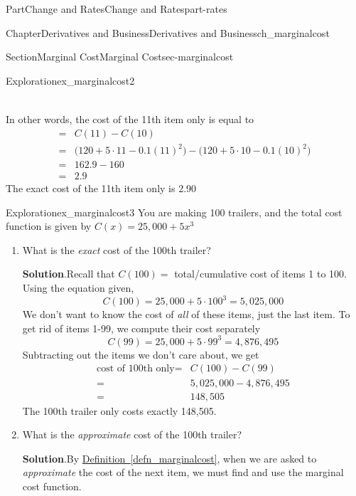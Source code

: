 \documentclass[oneside,10pt,]{tufte-book}
\newcommand{\blocktitlefont}{\relax}
\newcommand{\xreffont}{\relax}
\numberwithin{equation}{chapter}
\newcommand{\amp}{&}
\begin{document}
\begin{partptx}{Part}{Change and Rates}{}{Change and Rates}{}{}{part-rates}
\begin{chapterptx}{Chapter}{Derivatives and Business}{}{Derivatives and Business}{}{}{ch_marginalcost}
\begin{sectionptx}{Section}{Marginal Cost}{}{Marginal Cost}{}{}{sec-marginalcost}
\begin{exploration}{Exploration}{}{ex_marginalcost2}
\begin{enumerate}[font=\bfseries,label=(\alph*),ref=\alph*]
\begin{align*}
\end{align*}
%
\par
In other words, the cost of the 11th item only is equal to%
\begin{align*}
= \amp C(11) - C(10)\\
= \amp \Big( 120 + 5\cdot 11 - 0.1(11)^2\Big) - \Big(120 + 5\cdot 10 - 0.1(10)^2\Big)   \\
= \amp 162.9 - 160\\
= \amp 2.9
\end{align*}
The exact cost of the 11th item only is \textdollar{}2.90%
\end{enumerate}%
\end{exploration}%
\begin{exploration}{Exploration}{}{ex_marginalcost3}%
You are making 100 trailers, and the total cost function is given by \(C(x) = 25,000 + 5x^3\)%
\begin{enumerate}[font=\bfseries,label=(\alph*),ref=\alph*]%
\item{}What is the \emph{exact} cost of the 100th trailer?%
\par\smallskip%
\noindent\textbf{\blocktitlefont Solution}.\hypertarget{ex_marginalcost3-2-2}{}\quad{}Recall that \(C(100) = \) total\slash{}cumulative cost of items 1 to 100.  Using the equation given,%
\begin{equation*}
C(100) = 25,000 + 5\cdot 100^3 = 5,025,000
\end{equation*}
We don't want to know the cost of \emph{all} of these items, just the last item.  To get rid of items 1-99, we compute their cost separately%
\begin{equation*}
C(99) = 25,000 + 5\cdot 99^3 = 4,876,495
\end{equation*}
Subtracting out the items we don't care about, we get%
\begin{align*}
\text{cost of 100th only} = \amp C(100) - C(99) \\
= \amp 5,025,000 - 4,876,495\\
= \amp 148,505
\end{align*}
The 100th trailer only costs exactly \textdollar{}148,505.%
\item{}What is the \emph{approximate} cost of the 100th trailer?%
\par\smallskip%
\noindent\textbf{\blocktitlefont Solution}.\hypertarget{ex_marginalcost3-3-2}{}\quad{}By \hyperref[defn_marginalcost]{Definition~{\xreffont\ref{defn_marginalcost}}}, when we are asked to \emph{approximate} the cost of the next item, we must find and use the marginal cost function.%

\end{enumerate}
\end{exploration}
\end{sectionptx}
\end{chapterptx}
\end{partptx}
\end{document}

